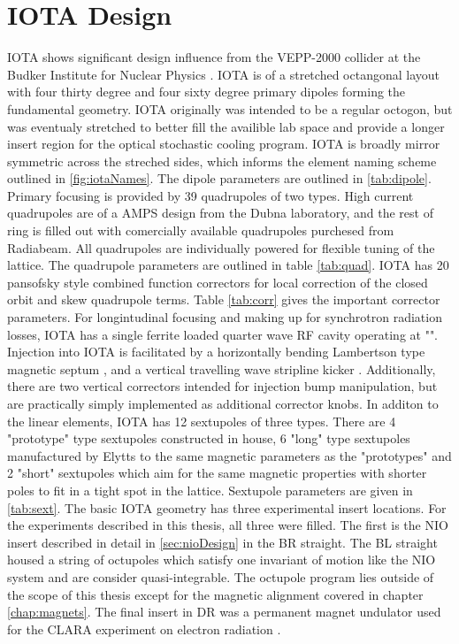 \section{IOTA Design}
IOTA shows significant design influence from the VEPP-2000 collider at the Budker Institute for Nuclear Physics \cite{vepp-2000}. IOTA is of a stretched octangonal layout with four thirty degree and four sixty degree primary dipoles forming the fundamental geometry. IOTA originally was intended to be a regular octogon, but was eventualy stretched to better fill the availible lab space and provide a longer insert region for the optical stochastic cooling program. IOTA is broadly mirror symmetric across the streched sides, which informs the element naming scheme outlined in \ref{fig:iotaNames}. The dipole parameters are outlined in \ref{tab:dipole}. Primary focusing is provided by 39 quadrupoles of two types. High current quadrupoles are of a AMPS design from the Dubna laboratory, and the rest of ring is filled out with comercially available quadrupoles purchesed from Radiabeam. All quadrupoles are individually powered for flexible tuning of the lattice. The quadrupole parameters are outlined in table \ref{tab:quad}. IOTA has 20 pansofsky \cite{panofsky} style combined function correctors for local correction of the closed orbit and skew quadrupole terms. Table \ref{tab:corr} gives the important corrector parameters. For longintudinal focusing and making up for synchrotron radiation losses, IOTA has a single ferrite loaded quarter wave RF cavity operating at "". Injection into IOTA is facilitated by a horizontally bending Lambertson type magnetic septum \cite{lambertsonPatent???}, and a vertical travelling wave stripline kicker \cite{antipovKicker}. Additionally, there are two vertical correctors intended for injection bump manipulation, but are practically simply implemented as additional corrector knobs. In additon to the linear elements, IOTA has 12 sextupoles of three types. There are 4 "prototype" type sextupoles constructed in house, 6 "long" type sextupoles manufactured by Elytts to the same magnetic parameters as the "prototypes" and 2 "short" sextupoles which aim for the same magnetic properties with shorter poles to fit in a tight spot in the lattice. Sextupole parameters are given in \ref{tab:sext}. The basic IOTA geometry has three experimental insert locations. For the experiments described in this thesis, all three were filled. The first is the NIO insert described in detail in \ref{sec:nioDesign} in the BR straight. The BL straight housed a string of octupoles which satisfy one invariant of motion like the NIO system and are consider quasi-integrable. The octupole program lies outside of the scope of this thesis except for the magnetic alignment covered in chapter \ref{chap:magnets}. The final insert in DR was a permanent magnet undulator used for the CLARA experiment on electron radiation \cite{clara}. 

